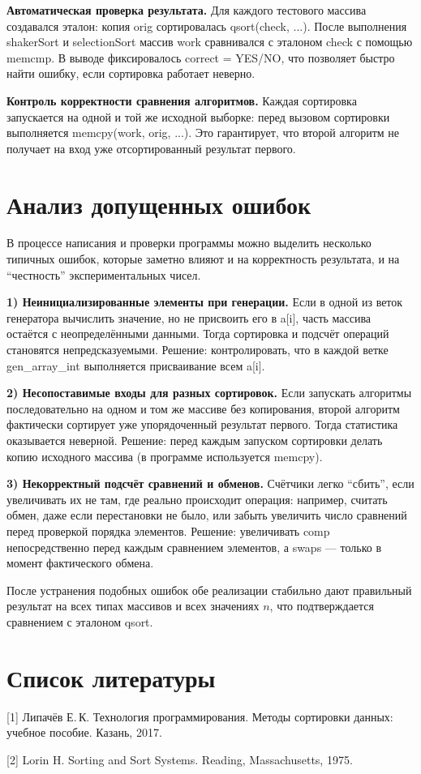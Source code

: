 \documentclass[a4paper,12pt]{article}
\newcommand{\code}[1]{{\ttfamily #1}}
\begin{document}
\textbf{Автоматическая проверка результата.}  
Для каждого тестового массива создавался эталон: копия \code{orig} сортировалась \code{qsort(check, ...)}. После выполнения \code{shakerSort} и \code{selectionSort} массив \code{work} сравнивался с эталоном \code{check} с помощью \code{memcmp}. В выводе фиксировалось \code{correct = YES/NO}, что позволяет быстро найти ошибку, если сортировка работает неверно.

\textbf{Контроль корректности сравнения алгоритмов.}  
Каждая сортировка запускается на одной и той же исходной выборке: перед вызовом сортировки выполняется \code{memcpy(work, orig, ...)}. Это гарантирует, что второй алгоритм не получает на вход уже отсортированный результат первого.

\section{Анализ допущенных ошибок}

В процессе написания и проверки программы можно выделить несколько типичных ошибок, которые заметно влияют и на корректность результата, и на “честность” экспериментальных чисел.

\textbf{1) Неинициализированные элементы при генерации.}  
Если в одной из веток генератора вычислить значение, но не присвоить его в \code{a[i]}, часть массива остаётся с неопределёнными данными. Тогда сортировка и подсчёт операций становятся непредсказуемыми. Решение: контролировать, что в каждой ветке \code{gen\_array\_int} выполняется присваивание всем \code{a[i]}.

\textbf{2) Несопоставимые входы для разных сортировок.}  
Если запускать алгоритмы последовательно на одном и том же массиве без копирования, второй алгоритм фактически сортирует уже упорядоченный результат первого. Тогда статистика оказывается неверной. Решение: перед каждым запуском сортировки делать копию исходного массива (в программе используется \code{memcpy}).

\textbf{3) Некорректный подсчёт сравнений и обменов.}  
Счётчики легко “сбить”, если увеличивать их не там, где реально происходит операция: например, считать обмен, даже если перестановки не было, или забыть увеличить число сравнений перед проверкой порядка элементов. Решение: увеличивать \code{*comp} непосредственно перед каждым сравнением элементов, а \code{*swaps} --- только в момент фактического обмена.

После устранения подобных ошибок обе реализации стабильно дают правильный результат на всех типах массивов и всех значениях $n$, что подтверждается сравнением с эталоном \code{qsort}.

\section{Список литературы}

[1] Липачёв Е.\,К. Технология программирования. Методы сортировки данных: учебное пособие. Казань, 2017.

[2] Lorin H. Sorting and Sort Systems. Reading, Massachusetts, 1975.
\end{document}
